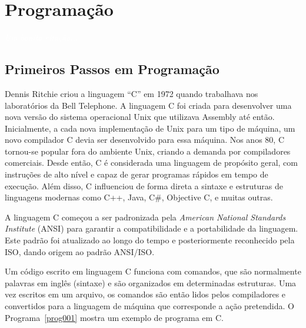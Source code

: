 \documentclass[11pt,fleqn]{book} %
\begin{document}
\chapter{Programação}\label{programacao}
\vspace{6em}
\begin{flushright}
	\textit{\textcolor{white}{Um bonita citação...}}
\end{flushright}
\vspace{12em}



\newpage
\section{Primeiros Passos em Programação}\label{disc:primeirospassos}

Dennis Ritchie criou a linguagem ``C'' em 1972 quando trabalhava nos laboratórios da Bell Telephone.
A linguagem C foi criada para desenvolver uma nova versão do sistema operacional Unix que utilizava Assembly até então.
Inicialmente, a cada nova implementação de Unix para um tipo de máquina, um novo compilador C devia ser desenvolvido para essa máquina.
Nos anos 80, C tornou-se popular fora do ambiente Unix, criando a demanda por compiladores comerciais.
Desde então, C é considerada uma linguagem de propósito geral, com instruções de alto nível e capaz de gerar programas rápidos em tempo de execução.
Além disso, C influenciou de forma direta a sintaxe e estruturas de linguagens modernas como C++, Java, C\#, Objective C, e muitas outras.

A linguagem C começou a ser padronizada pela \textit{American National Standards Institute} (ANSI) para garantir a compatibilidade e a portabilidade da linguagem.
Este padrão foi atualizado ao longo do tempo e posteriormente reconhecido pela ISO, dando origem ao padrão ANSI/ISO.

Um código escrito em linguagem C funciona com comandos, que são normalmente palavras em inglês (sintaxe) e são organizados em determinadas estruturas.
Uma vez escritos em um arquivo, os comandos são então lidos pelos compiladores e convertidos para a linguagem de máquina que corresponde a ação pretendida.
O Programa~\ref{prog001} mostra um exemplo de programa em C.
\end{document}
